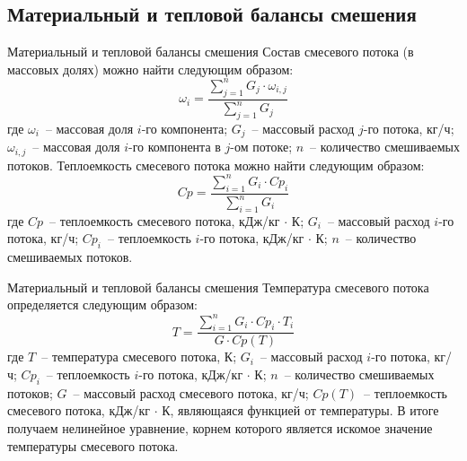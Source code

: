 \documentclass[aspectratio=169, mathserif]{beamer}%
\begin{document}
\subsection{Материальный и тепловой балансы смешения}
\begin{frame}[fragile]{Материальный и тепловой балансы смешения}
\scriptsize
Состав смесевого потока (в массовых долях) можно найти следующим образом:
\vfill
$$
	\omega _i = \dfrac{\sum \limits_ {j=1} ^{n} G_j \cdot \omega _{i,j}}{\sum \limits_ {j=1} ^{n} G_j}
$$
\vfill
где $\omega _i$~-- массовая доля $i$-го компонента; $G_j$~-- массовый расход $j$-го потока, кг/ч; $\omega _{i,j}$~-- массовая доля $i$-го компонента в $j$-ом потоке; $n$~-- количество смешиваемых потоков.
\vfill
Теплоемкость смесевого потока можно найти следующим образом:
\vfill
$$
	Cp = \dfrac{\sum \limits _{i=1} ^{n} G_i \cdot Cp_i}{\sum \limits _{i=1} ^{n} G_i}
$$
\vfill
где $Cp$~-- теплоемкость смесевого потока, кДж/кг $\cdot$ К; $G_i$~-- массовый расход $i$-го потока, кг/ч; $Cp_i$~-- теплоемкость $i$-го потока, кДж/кг $\cdot$ К; $n$~-- количество смешиваемых потоков.
\vfill
\end{frame}

\begin{frame}[fragile]{Материальный и тепловой балансы смешения}
\scriptsize
Температура смесевого потока определяется следующим образом:
\vfill
$$
	T = \dfrac{\sum \limits _{i=1} ^{n} G_i \cdot Cp_i \cdot T_i}{G \cdot Cp\left(T\right)}
$$
\vfill
где $T$~-- температура смесевого потока, К; $G_i$~-- массовый расход $i$-го потока, кг/ч; $Cp_i$~-- теплоемкость $i$-го потока, кДж/кг $\cdot$ К; $n$~-- количество смешиваемых потоков; $G$~-- массовый расход смесевого потока, кг/ч; $Cp\left(T\right)$~-- теплоемкость смесевого потока, кДж/кг $\cdot$ К, являющаяся функцией от температуры.
\vfill
В итоге получаем нелинейное уравнение, корнем которого является искомое значение температуры смесевого потока.
\vfill
\end{frame}
\end{document}
